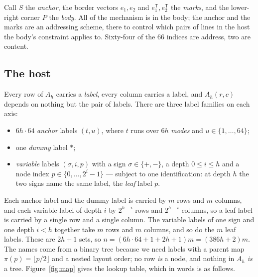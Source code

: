 \documentclass{article}
\theoremstyle{plain}
\theoremstyle{definition}
\begin{document}
Call $S$ the \emph{anchor}, the border vectors $e_1, e_2$ and
$e_1^{\mathsf T}, e_2^{\mathsf T}$ the \emph{marks},
and the lower-right corner $P$ the \emph{body}. All of the mechanism is in
the body; the anchor and the marks are an addressing scheme, there to
control which pairs of lines in the host the body's constraint applies to.
Sixty-four of the $66$ indices are address, two are content.

\subsection*{The host}

Every row of $A_h$ carries a \emph{label}, every column carries a label, and
$A_h(r,c)$ depends on nothing but the pair of labels. There are three label
families on each axis:
\begin{itemize}\itemsep1pt
\item $6h\cdot64$ \emph{anchor} labels $(t,u)$, where $t$ runs over $6h$
\emph{modes} and $u\in\{1,\dots,64\}$;
\item one \emph{dummy} label $*$;
\item \emph{variable} labels $(\sigma,i,p)$ with a sign
$\sigma\in\{+,-\}$, a depth $0\le i\le h$ and a node index
$p\in\{0,\dots,2^i-1\}$ --- subject to one identification: at depth $h$ the
two signs name the same label, the \emph{leaf} label $p$.
\end{itemize}
Each anchor label and the dummy label is carried by $m$ rows and $m$ columns,
and each variable label of depth $i$ by $2^{h-i}$ rows and $2^{h-i}$ columns,
so a leaf label is carried by a single row and a single column. The variable
labels of one sign and one depth $i<h$ together take $m$ rows and $m$ columns,
and so do the $m$ leaf labels. These are $2h+1$ sets, so
$n=(6h\cdot64+1+2h+1)m=(386h+2)m$. The names come from a binary tree because we need labels with
a parent map $\pi(p)=\lfloor p/2\rfloor$ and a nested layout order; no row
\emph{is} a node, and nothing in $A_h$ \emph{is} a tree. Figure~\ref{fig:map}
gives the lookup table, which in words is as follows.
\end{document}
